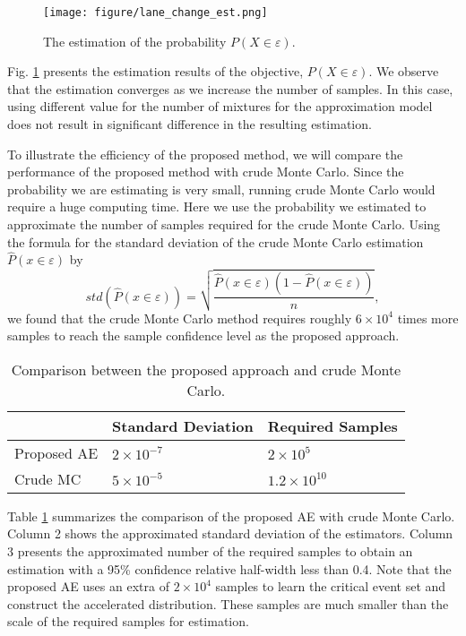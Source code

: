 \documentclass[letterpaper, 10 pt, journal]{IEEEtran}  %
\begin{document}
\begin{figure}[t]
	\centering
	\texttt{[image: figure/lane\_change\_est.png]}
	\caption{The estimation of the probability $P(X \in \varepsilon)$.}
	\label{fig:lane_est}
\end{figure}

Fig. \ref{fig:lane_est} presents the estimation results of the objective, $P(X \in \varepsilon)$. We observe that the estimation converges as we increase the number of samples. In this case, using different value for the number of mixtures for the approximation model does not result in significant difference in the resulting estimation.

To illustrate the efficiency of the proposed method, we will compare the performance of the proposed method with crude Monte Carlo. Since the probability we are estimating is very small, running crude Monte Carlo would require a huge computing time. Here we use the probability we estimated to approximate the number of samples required for the crude Monte Carlo. Using the formula for the standard deviation of the crude Monte Carlo estimation $\hat{P}(x \in \varepsilon)$ by \begin{equation}
std(\hat{P}(x \in \varepsilon))=\sqrt{\frac{\hat{P}(x \in \varepsilon)(1-\hat{P}(x \in \varepsilon))}{n}},
\end{equation} 
we found that the crude Monte Carlo method requires roughly $6 \times 10^4$ times more samples to reach the sample confidence level as the proposed approach. 

\begin{table}[t]
\centering
\caption{Comparison between the proposed approach and crude Monte Carlo.}
\label{table:compare}
\begin{tabular}{|l|l|l|}
\hline
            & Standard Deviation            & Required Samples                \\ \hline
Proposed AE & $2 \times 10^{-7}$ & $2 \times 10^5$    \\ \hline
Crude MC    & $5 \times 10^{-5}$ & $1.2 \times 10^{10}$ \\ \hline
\end{tabular}
\end{table}

Table \ref{table:compare} summarizes the comparison of the proposed AE with crude Monte Carlo. Column 2 shows the approximated standard deviation of the estimators. Column 3 presents the approximated number of the required samples to obtain an estimation with a 95\% confidence relative half-width less than 0.4. Note that the proposed AE uses an extra of $2 \times 10^4$ samples to learn the critical event set and construct the accelerated distribution. These samples are much smaller than the scale of the required samples for estimation.
\end{document}
